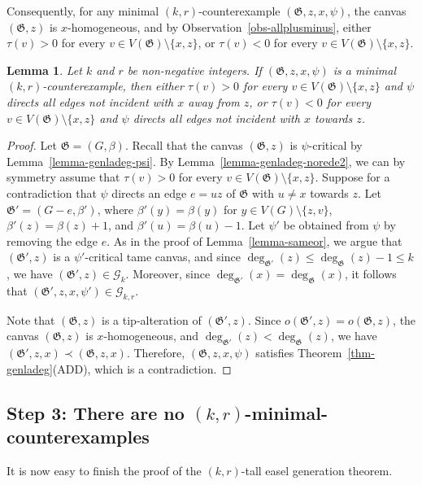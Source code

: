 \documentclass{article}
\newcommand{\GG}{\mathcal{G}}
\newcommand\g{\mathfrak{G}}
\newtheorem{lemma}[theorem]{Lemma}
\begin{document}
Consequently, for any minimal $(k,r)$-counter\-exam\-ple $(\g,z,x,\psi)$, the canvas $(\g,z)$ is $x$-homogeneous, and by Observation~\ref{obs-allplusminus},
either $\tau(v)>0$ for every $v\in V(\g)\setminus\{x,z\}$, or $\tau(v)<0$ for every $v\in V(\g)\setminus\{x,z\}$.

\begin{lemma}\label{lemma-genladeg-norede1}
Let $k$ and $r$ be non-negative integers.  If $(\g,z,x,\psi)$ is a minimal $(k,r)$-counter\-example, then
either $\tau(v)>0$ for every $v\in V(\g)\setminus\{x,z\}$ and $\psi$ directs all edges not incident with $x$ away from $z$,
or $\tau(v)<0$ for every $v\in V(\g)\setminus\{x,z\}$ and $\psi$ directs all edges not incident with $x$ towards $z$.
\end{lemma}
\begin{proof}
Let $\g=(G,\beta)$.  Recall that the canvas $(\g,z)$ is $\psi$-critical by Lemma~\ref{lemma-genladeg-psi}.
By Lemma~\ref{lemma-genladeg-norede2}, we can by symmetry assume that $\tau(v)>0$ for every $v\in V(\g)\setminus\{x,z\}$.
Suppose for a contradiction that $\psi$ directs an edge $e=uz$ of $\g$ with $u\neq x$ towards $z$.
Let $\g'=(G-e,\beta')$, where $\beta'(y)=\beta(y)$ for $y\in V(G)\setminus\{z,v\}$, $\beta'(z)=\beta(z)+1$, and $\beta'(u)=\beta(u)-1$.
Let $\psi'$ be obtained from $\psi$ by removing the edge $e$.  As in the proof of Lemma~\ref{lemma-sameor}, we argue that $(\g',z)$ is
a $\psi'$-critical tame canvas, and since $\deg_{\g'}(z)\le \deg_{\g}(z)-1\le k$, we have $(\g',z)\in \GG_k$.
Moreover, since $\deg_{\g'}(x)=\deg_{\g}(x)$, it follows that $(\g',z,x,\psi')\in\GG_{k,r}$.

Note that $(\g,z)$ is a tip-alteration of $(\g',z)$.
Since $o(\g',z)=o(\g,z)$, the canvas $(\g,z)$ is $x$-homogeneous, and $\deg_{\g'}(z)<\deg_{\g}(z)$,
we have $(\g',z,x)\prec (\g,z,x)$.  Therefore, $(\g,z,x,\psi)$ satisfies Theorem~\ref{thm-genladeg}(ADD), which is a contradiction.
\end{proof}
\subsection{Step 3: There are no $(k,r)$-minimal-counterexamples}\label{subsec:easelfinisher}
It is now easy to finish the proof of the $(k,r)$-tall easel generation theorem.
\end{document}
